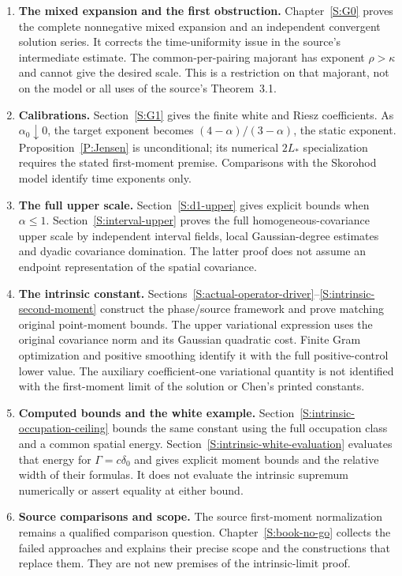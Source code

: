 \documentclass[12pt,oneside,openany]{book}
\numberwithin{equation}{section}
\theoremstyle{nogostyle}
\theoremstyle{definition}
\begin{document}
\begin{enumerate}[1.]
  \item \textbf{The mixed expansion and the first obstruction.}
    Chapter~\ref{S:G0} proves the complete nonnegative mixed expansion and an
    independent convergent solution series. It corrects the time-uniformity
    issue in the source's intermediate estimate. The common-per-pairing majorant
    has exponent $\rho > \kappa$ and cannot give the desired scale. This is a
    restriction on that majorant, not on the model or all uses of the source's
    Theorem~3.1.
  \item \textbf{Calibrations.}
    Section~\ref{S:G1} gives the finite white and Riesz coefficients. As
    $\alpha_0\downarrow0$, the target exponent becomes $(4-\alpha)/(3-\alpha)$,
    the static exponent. Proposition~\ref{P:Jensen} is unconditional; its
    numerical $2L_*$ specialization requires the stated first-moment premise.
    Comparisons with the Skorohod model identify time exponents only.
  \item \textbf{The full upper scale.}
    Section~\ref{S:d1-upper} gives explicit bounds when $\alpha \le 1$.
    Section~\ref{S:interval-upper} proves the full homogeneous-covariance upper
    scale by independent interval fields, local Gaussian-degree estimates and
    dyadic covariance domination. The latter proof does not assume an endpoint
    representation of the spatial covariance.
  \item \textbf{The intrinsic constant.}
    Sections~\ref{S:actual-operator-driver}--\ref{S:intrinsic-second-moment}
    construct the phase/source framework and prove matching original
    point-moment bounds. The upper variational expression uses the original
    covariance norm and its Gaussian quadratic cost. Finite Gram optimization
    and positive smoothing identify it with the full positive-control lower
    value. The auxiliary coefficient-one variational quantity is not identified
    with the first-moment limit of the solution or Chen's printed constants.
  \item \textbf{Computed bounds and the white example.}
    Section~\ref{S:intrinsic-occupation-ceiling} bounds the same constant using
    the full occupation class and a common spatial energy.
    Section~\ref{S:intrinsic-white-evaluation} evaluates that energy for $\Gamma
    = c\delta_0$ and gives explicit moment bounds and the relative width of
    their formulas. It does not evaluate the intrinsic supremum numerically or
    assert equality at either bound.
  \item \textbf{Source comparisons and scope.}
    The source first-moment normalization remains a qualified comparison
    question. Chapter~\ref{S:book-no-go} collects the failed approaches and
    explains their precise scope and the constructions that replace them.
    They are not new premises of the intrinsic-limit proof.
\end{enumerate}
\end{document}
